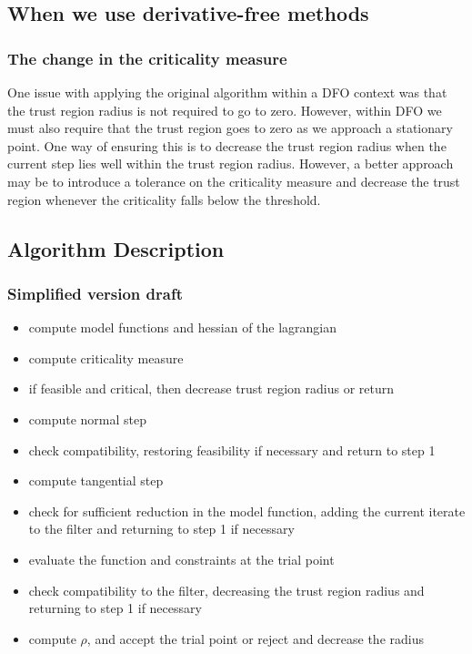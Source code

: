 \documentclass{article}
\begin{document}
\subsection{When we use derivative-free methods}

\subsubsection{The change in the criticality measure}
One issue with applying the original algorithm within a DFO context was that the trust region radius is not required to go to zero. However, within DFO we must also require that the trust region goes to zero as we approach a stationary point. One way of ensuring this is to decrease the trust region radius when the current step lies well within the trust region radius. However, a better approach may be to introduce a tolerance on the criticality measure and decrease the trust region whenever the criticality falls below the threshold.


\subsection{Algorithm Description}

\subsubsection{Simplified version draft}

\begin{itemize}
\item compute model functions and hessian of the lagrangian
\item compute criticality measure
\item if feasible and critical, then decrease trust region radius or return
\item compute normal step
\item check compatibility, restoring feasibility if necessary and return to step 1
\item compute tangential step
\item check for sufficient reduction in the model function, adding the current iterate to the filter and returning to step 1 if necessary
\item evaluate the function and constraints at the trial point
\item check compatibility to the filter, decreasing the trust region radius and returning to step 1 if necessary
\item compute $\rho$, and accept the trial point or reject and decrease the radius
\end{itemize}
\end{document}
